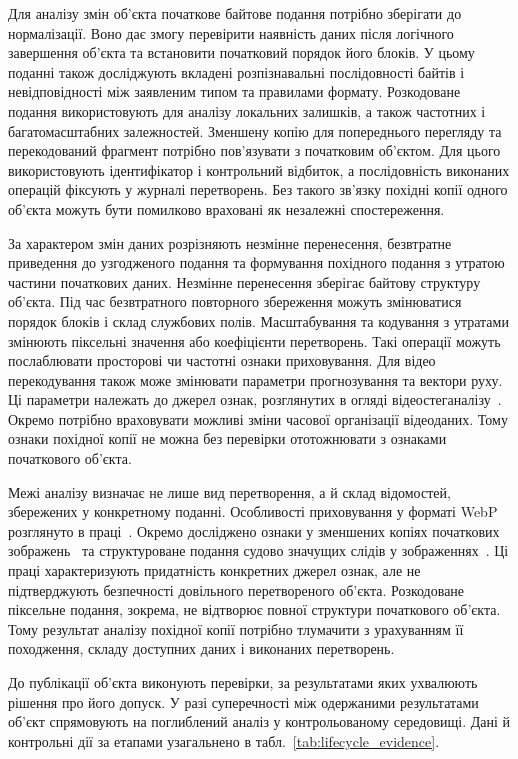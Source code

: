 Для аналізу змін об’єкта початкове байтове подання потрібно зберігати до нормалізації. Воно дає змогу перевірити наявність даних після логічного завершення об’єкта та встановити початковий порядок його блоків. У цьому поданні також досліджують вкладені розпізнавальні послідовності байтів і невідповідності між заявленим типом та правилами формату. Розкодоване подання використовують для аналізу локальних залишків, а також частотних і багатомасштабних залежностей. Зменшену копію для попереднього перегляду та перекодований фрагмент потрібно пов’язувати з початковим об’єктом. Для цього використовують ідентифікатор і контрольний відбиток, а послідовність виконаних операцій фіксують у журналі перетворень. Без такого зв’язку похідні копії одного об’єкта можуть бути помилково враховані як незалежні спостереження.

За характером змін даних розрізняють незмінне перенесення, безвтратне приведення до узгодженого подання та формування похідного подання з утратою частини початкових даних. Незмінне перенесення зберігає байтову структуру об’єкта. Під час безвтратного повторного збереження можуть змінюватися порядок блоків і склад службових полів. Масштабування та кодування з утратами змінюють піксельні значення або коефіцієнти перетворень. Такі операції можуть послаблювати просторові чи частотні ознаки приховування. Для відео перекодування також може змінювати параметри прогнозування та вектори руху. Ці параметри належать до джерел ознак, розглянутих в огляді відеостеганалізу~\cite{bouzegza2022video}. Окремо потрібно враховувати можливі зміни часової організації відеоданих. Тому ознаки похідної копії не можна без перевірки ототожнювати з ознаками початкового об’єкта.

Межі аналізу визначає не лише вид перетворення, а й склад відомостей, збережених у конкретному поданні. Особливості приховування у форматі WebP розглянуто в праці~\cite{koptyra2023webp}. Окремо досліджено ознаки у зменшених копіях початкових зображень~\cite{benes2023thumbnails} та структуроване подання судово значущих слідів у зображеннях~\cite{kiltz2024trace}. Ці праці характеризують придатність конкретних джерел ознак, але не підтверджують безпечності довільного перетвореного об’єкта. Розкодоване піксельне подання, зокрема, не відтворює повної структури початкового об’єкта. Тому результат аналізу похідної копії потрібно тлумачити з урахуванням її походження, складу доступних даних і виконаних перетворень.

До публікації об’єкта виконують перевірки, за результатами яких ухвалюють рішення про його допуск. У разі суперечності між одержаними результатами об’єкт спрямовують на поглиблений аналіз у контрольованому середовищі. Дані й контрольні дії за етапами узагальнено в табл.~\ref{tab:lifecycle_evidence}.

